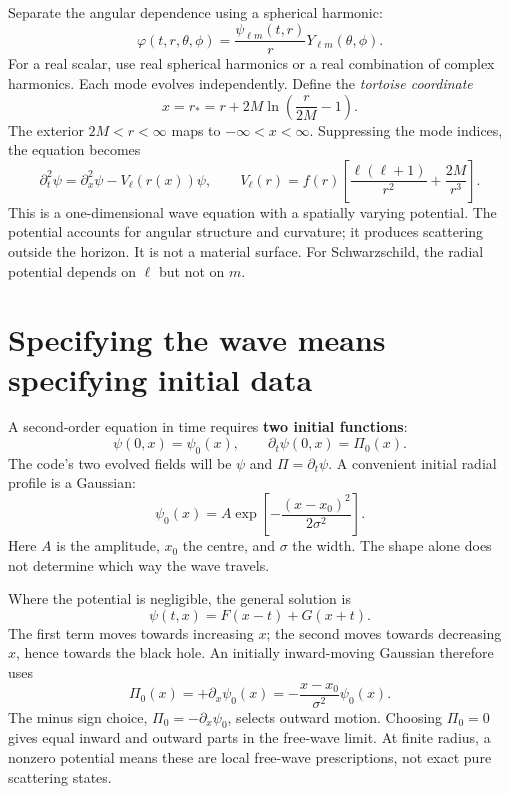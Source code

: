 \documentclass[11pt,a4paper]{article}
\begin{document}
Separate the angular dependence using a spherical harmonic:
\begin{equation}
 \varphi(t,r,\theta,\phi)=\frac{\psi_{\ell m}(t,r)}{r}
 Y_{\ell m}(\theta,\phi).
\end{equation}
For a real scalar, use real spherical harmonics or a real combination of
complex harmonics. Each mode evolves independently. Define the
\emph{tortoise coordinate}
\begin{equation}
 x=r_*=r+2M\ln\left(\frac{r}{2M}-1\right).
\end{equation}
The exterior \(2M<r<\infty\) maps to \(-\infty<x<\infty\).
Suppressing the mode indices, the equation becomes
\begin{equation}
 \boxed{\quad \partial_t^2\psi=\partial_x^2\psi-V_\ell(r(x))\psi,\qquad
 V_\ell(r)=f(r)\left[\frac{\ell(\ell+1)}{r^2}
                         +\frac{2M}{r^3}\right].\quad}
\end{equation}
This is a one-dimensional wave equation with a spatially varying
potential. The potential accounts for angular structure and curvature;
it produces scattering outside the horizon. It is not a material
surface. For Schwarzschild, the radial potential depends on \(\ell\)
but not on \(m\).

\clearpage
\section{Specifying the wave means specifying initial data}

A second-order equation in time requires \textbf{two initial functions}:
\begin{equation}
 \psi(0,x)=\psi_0(x),\qquad
 \partial_t\psi(0,x)=\Pi_0(x).
\end{equation}
The code's two evolved fields will be
\(\psi\) and \(\Pi=\partial_t\psi\).
A convenient initial radial profile is a Gaussian:
\begin{equation}
 \psi_0(x)=A\exp\left[-\frac{(x-x_0)^2}{2\sigma^2}\right].
\end{equation}
Here \(A\) is the amplitude, \(x_0\) the centre, and \(\sigma\) the width.
The shape alone does not determine which way the wave travels.

Where the potential is negligible, the general solution is
\begin{equation}
 \psi(t,x)=F(x-t)+G(x+t).
\end{equation}
The first term moves towards increasing \(x\); the second moves towards
decreasing \(x\), hence towards the black hole. An initially inward-moving
Gaussian therefore uses
\begin{equation}
 \boxed{\quad \Pi_0(x)=+\partial_x\psi_0(x)
              =-\frac{x-x_0}{\sigma^2}\psi_0(x).\quad}
\end{equation}
The minus sign choice, \(\Pi_0=-\partial_x\psi_0\), selects outward motion.
Choosing \(\Pi_0=0\) gives equal inward and outward parts in the free-wave
limit. At finite radius, a nonzero potential means these are local
free-wave prescriptions, not exact pure scattering states.
\end{document}

